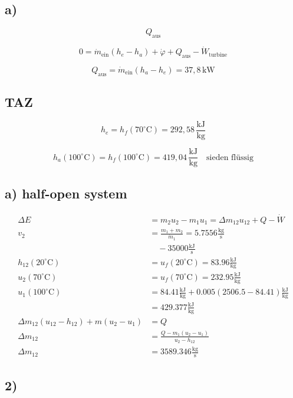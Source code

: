 

\subsection*{a)}

\[
Q_{\text{aus}}
\]

\[
0 = \dot{m}_{\text{ein}} \left( h_e - h_a \right) + \dot{\varphi} + Q_{\text{aus}} - \dot{W}_{\text{turbine}}
\]

\[
Q_{\text{aus}} = \dot{m}_{\text{ein}} \left( h_a - h_e \right) = 37{,}8 \, \text{kW}
\]

\subsection*{TAZ}

\[
h_e = h_f (70^\circ \text{C}) = 292{,}58 \, \frac{\text{kJ}}{\text{kg}}
\]

\[
h_{a} (100^\circ \text{C}) = h_f (100^\circ \text{C}) = 419{,}04 \, \frac{\text{kJ}}{\text{kg}} \quad \text{sieden flüssig}
\]

\subsection*{a) half-open system}

\begin{align*}
\Delta E &= m_2 u_2 - m_1 u_1 = \Delta m_{12} u_{12} + Q - \dot{W} \\
v_2 &= \frac{m_1 + m_2}{\dot{m}_1} = 5.7556 \frac{\text{kg}}{\text{s}} \\
&\quad - 35000 \frac{\text{kJ}}{\text{s}} \\
h_{12} (20^\circ \text{C}) &= u_f (20^\circ \text{C}) = 83.96 \frac{\text{kJ}}{\text{kg}} \\
u_2 (70^\circ \text{C}) &= u_f (70^\circ \text{C}) = 232.95 \frac{\text{kJ}}{\text{kg}} \\
u_1 (100^\circ \text{C}) &= 84.41 \frac{\text{kJ}}{\text{kg}} + 0.005 (2506.5 - 84.41) \frac{\text{kJ}}{\text{kg}} \\
&= 429.377 \frac{\text{kJ}}{\text{kg}} \\
\Delta m_{12} (u_{12} - h_{12}) + m (u_2 - u_1) &= Q \\
\Delta m_{12} &= \frac{Q - m_1 (u_2 - u_1)}{u_2 - h_{12}} \\
\Delta m_{12} &= 3589.346 \frac{\text{kg}}{\text{s}}
\end{align*}

\subsection*{2)}

